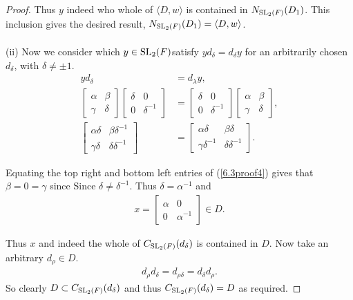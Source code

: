 \begin{proof}
Thus $y$ indeed who whole of $\langle D , w \rangle$ is contained in $N_{\operatorname{SL}_2(F)}(D_1)$. This inclusion gives the desired result, $N_{\operatorname{SL}_2(F)}(D_1) = \langle D , w \rangle$. \\
\\
(ii) Now we consider which $y \in \operatorname{SL}_2(F)$satisfy $y d_\delta = d_\delta y$ for an arbitrarily chosen $d_\delta$, with $\delta \neq \pm 1$.
\begin{align}\label{6.3proof4} y d_ \delta &= d_\lambda y, \nonumber \\[1.5ex]
\begin{bmatrix} \alpha & \beta \\ \gamma & \delta \end{bmatrix} \begin{bmatrix} \delta & 0 \\ 0 & \delta^{-1} \end{bmatrix} &= \begin{bmatrix} \delta & 0 \\ 0 & \delta^{-1} \end{bmatrix} \begin{bmatrix} \alpha & \beta \\ \gamma & \delta \end{bmatrix}, \nonumber \\[1.5ex]
\begin{bmatrix} \alpha \delta & \beta \delta^{-1} \\ \gamma \delta & \delta \delta^{-1} \end{bmatrix} &= \begin{bmatrix} \alpha \delta & \beta \delta \\ \gamma \delta^{-1} & \delta \delta^{-1} \end{bmatrix}.
\end{align}

Equating the top right and bottom left entries of (\ref{6.3proof4}) gives that $\beta = 0 = \gamma$ since Since $\delta \neq \delta^{-1}$. Thus $\delta = \alpha^{-1}$ and 
\begin{align*} x = \begin{bmatrix} \alpha & 0 \\ 0 & \alpha^{-1} \end{bmatrix} \in D. 
\end{align*}

Thus $x$ and indeed the whole of $C_{\operatorname{SL}_2(F)}(d_\delta)$ is contained in $D$. Now take an arbitrary $d_\rho \in D$.
\begin{align*} d_\rho d_\delta = d_{\rho \delta} = d_\delta d_\rho.
\end{align*}
So clearly $D \subset C_{\operatorname{SL}_2(F)}(d_\delta)$ and thus $C_{\operatorname{SL}_2(F)}(d_\delta) = D$ as required.
\end{proof}


